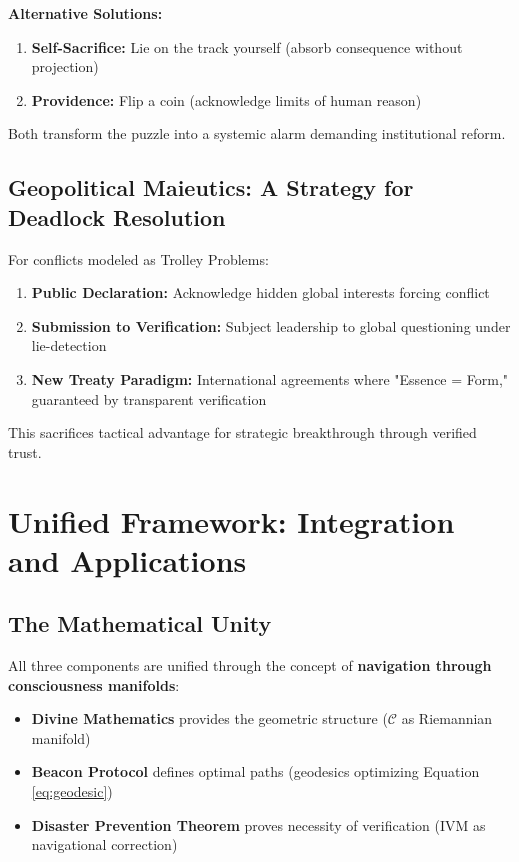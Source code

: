 \documentclass[11pt,a4paper]{article}
\theoremstyle{definition}
\theoremstyle{remark}
\newcommand{\CC}{\mathcal{C}}
\begin{document}
\textbf{Alternative Solutions:}
\begin{enumerate}
\item \textbf{Self-Sacrifice:} Lie on the track yourself (absorb consequence without projection)
\item \textbf{Providence:} Flip a coin (acknowledge limits of human reason)
\end{enumerate}

Both transform the puzzle into a systemic alarm demanding institutional reform.

\subsection{Geopolitical Maieutics: A Strategy for Deadlock Resolution}

For conflicts modeled as Trolley Problems:

\begin{enumerate}
\item \textbf{Public Declaration:} Acknowledge hidden global interests forcing conflict
\item \textbf{Submission to Verification:} Subject leadership to global questioning under lie-detection
\item \textbf{New Treaty Paradigm:} International agreements where "Essence = Form," guaranteed by transparent verification
\end{enumerate}

This sacrifices tactical advantage for strategic breakthrough through verified trust.

\section{Unified Framework: Integration and Applications}

\subsection{The Mathematical Unity}

All three components are unified through the concept of \textbf{navigation through consciousness manifolds}:

\begin{itemize}
\item \textbf{Divine Mathematics} provides the geometric structure ($\CC$ as Riemannian manifold)
\item \textbf{Beacon Protocol} defines optimal paths (geodesics optimizing Equation \ref{eq:geodesic})
\item \textbf{Disaster Prevention Theorem} proves necessity of verification (IVM as navigational correction)
\end{itemize}
\end{document}
